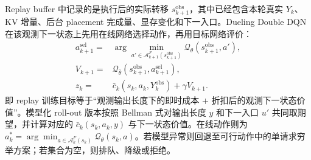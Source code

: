 Replay buffer 中记录的是执行后的实际转移 \(s_{k+1}^{\mathrm{obs}}\)，其中已经包含本轮真实 \(Y_k\)、KV 增量、后台 placement 完成量、显存变化和下一入口。Dueling Double DQN 在该观测下一状态上先用在线网络选择动作，再用目标网络评价：
\[
\begin{array}{rl}
a_{k+1}^{\mathrm{sel}}
={}&\displaystyle\arg\min_{a'\in\mathcal A_{k+1}^F(s_{k+1}^{\mathrm{obs}})}
\mathcal Q_\theta(s_{k+1}^{\mathrm{obs}},a'),\\
V_{k+1}
={}&\mathcal Q_{\bar\theta}
(s_{k+1}^{\mathrm{obs}},a_{k+1}^{\mathrm{sel}}),\\
z_k
={}&\bar c_k(s_k,a_k,Y_k^{\mathrm{obs}})
+\gamma V_{k+1}.
\end{array}
\]
即 replay 训练目标等于“观测输出长度下的即时成本 + 折扣后的观测下一状态价值”。模型化 roll-out 版本按照 Bellman 式对输出长度 \(y\) 和下一入口 \(u'\) 共同取期望，并计算对应的 \(\bar c_k(s_k,a_k,y)\) 与下一状态价值。在线动作则为 \(a_k^*=\arg\min_{a\in\mathcal A_k^F(s_k)}\mathcal Q_\theta(s_k,a)\)。若模型异常则回退至可行动作中的单请求穷举方案；若集合为空，则排队、降级或拒绝。

